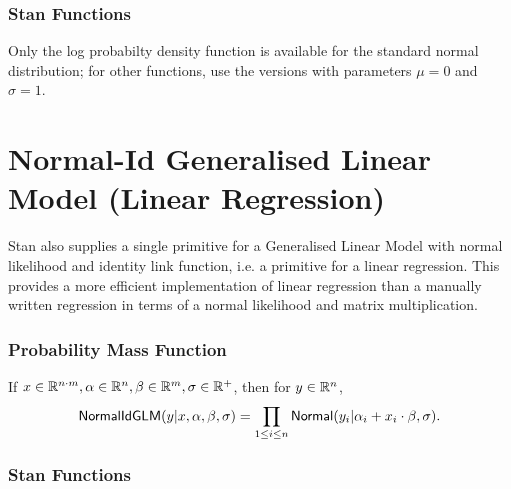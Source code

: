 \subsubsection{Stan Functions}

Only the log probabilty density function is available for the standard
normal distribution; for other functions, use the 
versions with parameters $\mu = 0$ and $\sigma = 1$.

\begin{description}
\end{description}




\section{Normal-Id Generalised Linear Model (Linear
Regression)}
\label{normal-id-glm.section}

Stan also supplies a single primitive for a Generalised Linear Model with
normal likelihood and identity link function, i.e. a primitive for a
linear regression.
This provides a more efficient implementation of linear regression
than a manually written regression in terms of a normal likelihood
and matrix multiplication.

\subsubsection{Probability Mass Function}

If $x\in \mathbb{R}^{n\cdot m}, \alpha \in \mathbb{R}^n, \beta\in \mathbb{R}^m,
\sigma\in \mathbb{R}^+$, then for
$y \in \mathbb{R}^n$,
\[
\mbox{\sf NormalIdGLM}(y|x, \alpha, \beta, \sigma)
=
\prod_{1\leq i \leq n}\mbox{\sf Normal}(y_i|\alpha_i +
x_i\cdot \beta, \sigma).
\]


\subsubsection{Stan Functions}

\begin{description}
%
%
\end{description}

